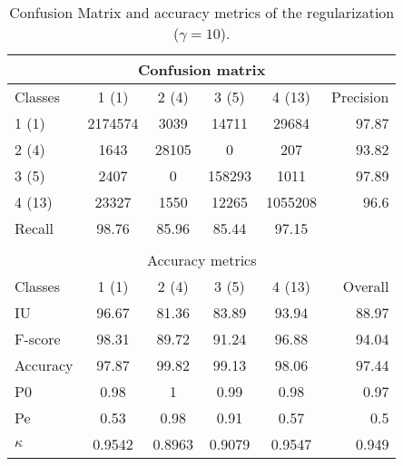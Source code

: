 \begin{table}[H]
\begin{center}
\footnotesize
\begin{tabular}{|l|c|c|c|c|r|}
\hline
\multicolumn{6}{|c|}{Confusion matrix} \\
\hline
 Classes & 1 (1) & 2 (4) & 3 (5) & 4 (13) & Precision \\
\hline
1 (1) & 2174574 & 3039 & 14711 & 29684 & 97.87 \\
\hline
2 (4) & 1643 & 28105 & 0 & 207 & 93.82 \\
\hline
3 (5) & 2407 & 0 & 158293 & 1011 & 97.89 \\
\hline
4 (13) & 23327 & 1550 & 12265 & 1055208 & 96.6 \\
\hline
Recall & 98.76 & 85.96 & 85.44 & 97.15 &  \\
\hline
\multicolumn{6}{c}{ } \\
\hline
\multicolumn{6}{|c|}{Accuracy metrics} \\
\hline
 Classes & 1 (1) & 2 (4) & 3 (5) & 4 (13) & Overall \\
\hline
IU & 96.67 & 81.36 & 83.89 & 93.94 & 88.97 \\
\hline
F-score & 98.31 & 89.72 & 91.24 & 96.88 & 94.04 \\
\hline
Accuracy & 97.87 & 99.82 & 99.13 & 98.06 & 97.44 \\
\hline
P0 & 0.98 & 1 & 0.99 & 0.98 & 0.97 \\
\hline
Pe & 0.53 & 0.98 & 0.91 & 0.57 & 0.5 \\
\hline
$\kappa$ & 0.9542 & 0.8963 & 0.9079 & 0.9547 & 0.949 \\
\hline
\end{tabular}
\caption{Confusion Matrix and accuracy metrics of the regularization ($\gamma=10$).}
\label{table:}
\end{center}
\end{table}
